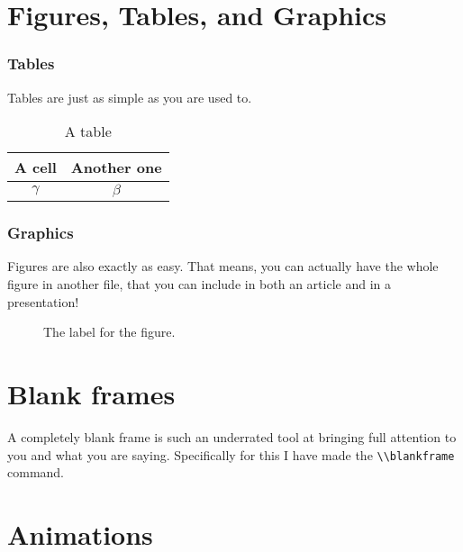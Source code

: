 \documentclass[english, aspectratio=169]{beamer}
\begin{document}
\section{Figures, Tables, and Graphics}
\begin{frame}
  \frametitle{Tables}
  Tables are just as simple as you are used to.

  \begin{table}
    \centering
    \begin{tabular}{c|c}
      A cell & Another one
      \\ \hline
      $\gamma$ & $\beta$
    \end{tabular}

    \caption{A table}
    \label{tab:label}
  \end{table}
\end{frame}


\begin{frame}
  \frametitle{Graphics}
  Figures are also exactly as easy. That means, you can actually have the whole
  figure in another file, that you can include in both an article and in a
  presentation!

  \begin{figure}
    \centering
    

    \caption{The label for the figure.}
    \label{fig:label}
  \end{figure}
\end{frame}

\section{Blank frames}

\begin{frame}
  A completely blank frame is such an underrated tool at bringing full attention
  to you and what you are saying. Specifically for this I have made the
  \lstinline{\\blankframe} command.
\end{frame}

\blankframe

\section{Animations}
\end{document}
